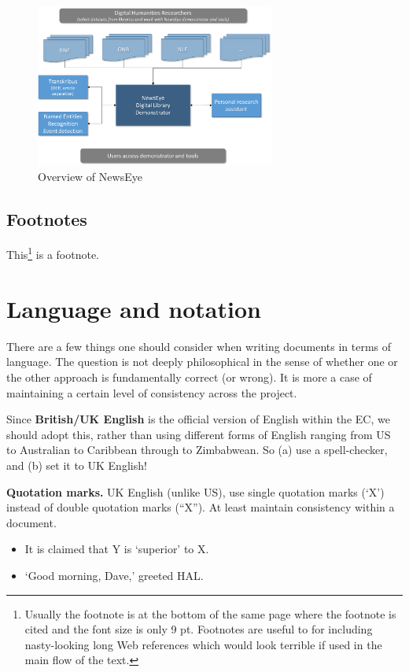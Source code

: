 \documentclass{newseye_del}
\begin{document}
\begin{figure}[H]
	\centering
	\includegraphics[width=0.7\textwidth]{overviewNewsEye.png}

	\caption{Overview of NewsEye}
	\label{fig:place}
\end{figure}


\subsection{Footnotes}

This\footnote{Usually the footnote is at the bottom of the same page where the
footnote is cited and the font size is only 9 pt. Footnotes are useful to for
including nasty-looking long Web references which would look terrible if used in
the main flow of the text.} is a footnote.


\section{Language and notation} There are a few things one should consider when
writing documents in terms of language. The question is not deeply philosophical
in the sense of whether one or the other approach is fundamentally correct (or
wrong). It is more a case of maintaining a certain level of consistency across
the project.

Since \textbf{British/UK English} is the official version of English within the
EC, we should adopt this, rather than using different forms of English ranging
from US to Australian to Caribbean through to Zimbabwean. So (a) use a
spell-checker, and (b) set it to UK English!

\textbf{Quotation marks.} UK English (unlike US), use single quotation marks
(`X') instead of double quotation marks (``X''). At least maintain consistency
within a document.

\begin{itemize}
    \item It is claimed that Y is `superior' to X.
    \item `Good morning, Dave,' greeted HAL.
\end{itemize}
\end{document}
